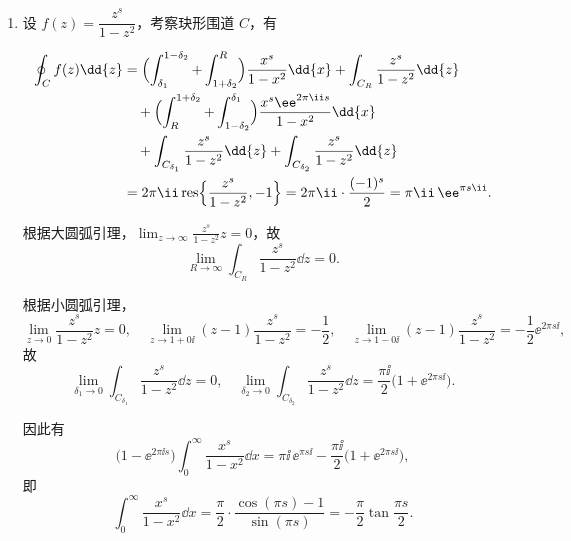 \begin{question}
\begin{solution}
\begin{enumerate}
不妨先计算 \(\displaystyle\operatorname{v.p.}\int_{-\infty}^{\infty}\frac{\ee^{px}}{1-\ee^{x}}\dd{x}\).

  \item 设 \(f(z)=\dfrac{z^{s}}{1-z^{2}}\)，考察玦形围道 \(C\)，有

\begin{center}
\end{center}

\[
\begin{aligned}
\oint_C f(z)\dd{z}
&=\Bigl(\int_{\delta_1}^{1-\delta_2}+\int_{1+\delta_2}^{R}\Bigr)\frac{x^{s}}{1-x^{2}}\dd{x}
   +\int_{C_R}\frac{z^{s}}{1-z^{2}}\dd{z}\\
&\quad+\Bigl(\int_{R}^{1+\delta_2}+\int_{1-\delta_2}^{\delta_1}\Bigr)\frac{x^{s}\ee^{2\pi\ii s}}{1-x^{2}}\dd{x}\\
&\quad+\int_{C_{\delta_1}}\frac{z^{s}}{1-z^{2}}\dd{z}
   +\int_{C_{\delta_2}}\frac{z^{s}}{1-z^{2}}\dd{z}\\
&=2\pi\ii\operatorname{res}\Bigl\{\frac{z^{s}}{1-z^{2}},-1\Bigr\}
   =2\pi\ii\cdot\frac{(-1)^{s}}{2}
   =\pi\ii\,\ee^{\pi s\ii}.
\end{aligned}
\]

根据大圆弧引理，\(\displaystyle\lim_{z\to\infty}\frac{z^{s}}{1-z^{2}}z=0\)，故
\[
\lim_{R\to\infty}\int_{C_R}\frac{z^{s}}{1-z^{2}}\dd{z}=0.
\]

根据小圆弧引理，
\[
\lim_{z\to0}\frac{z^{s}}{1-z^{2}}z=0,\quad
\lim_{z\to1+0\ii}(z-1)\frac{z^{s}}{1-z^{2}}=-\frac12,\quad
\lim_{z\to1-0\ii}(z-1)\frac{z^{s}}{1-z^{2}}=-\frac12\ee^{2\pi s\ii},
\]
故
\[
\lim_{\delta_1\to0}\int_{C_{\delta_1}}\frac{z^{s}}{1-z^{2}}\dd{z}=0,\quad
\lim_{\delta_2\to0}\int_{C_{\delta_2}}\frac{z^{s}}{1-z^{2}}\dd{z}
   =\frac{\pi\ii}{2}\bigl(1+\ee^{2\pi s\ii}\bigr).
\]

因此有
\[
\bigl(1-\ee^{2\pi\ii s}\bigr)\int_0^\infty \frac{x^{s}}{1-x^{2}}\dd{x}
   =\pi\ii\,\ee^{\pi s\ii} - \frac{\pi\ii}{2}\bigl(1+\ee^{2\pi s\ii}\bigr),
\]
即
\[
\int_0^\infty \frac{x^{s}}{1-x^{2}}\dd{x}
   =\frac{\pi}{2}\cdot\frac{\cos(\pi s)-1}{\sin(\pi s)}
   =-\frac{\pi}{2}\tan\frac{\pi s}{2}.
\]
\end{enumerate}
\end{solution}
\end{question}
